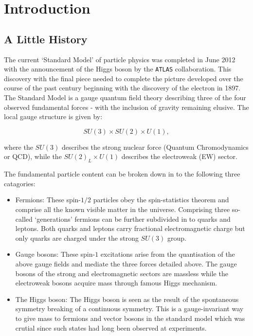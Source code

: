 \chapter{Introduction}
\label{chap:intro}

\section{A Little History}
\label{sec:history}

	The current `Standard Model' of particle physics was completed in June 2012 with the announcement of the Higgs boson by the \texttt{ATLAS} collaboration.
	This discovery with the final piece needed to complete the picture developed over the course of the past century beginning with the discovery of the electron in 1897.
	The Standard Model is a gauge quantum field theory describing three of the four observed fundamental forces - with the inclusion of gravity remaining elusive.
	The local gauge structure is given by:

	\begin{equation}
		SU(3)\times SU(2)\times U(1),
		\label{eq:SMGauge}
	\end{equation}

	where the $SU(3)$ describes the strong nuclear force (Quantum Chromodynamics or QCD), while the $SU(2)_L\times U(1)$ describes the electroweak (EW) sector.

	The fundamental particle content can be broken down in to the following three catagories:

	\begin{itemize}
		\item Fermions: These spin-$1/2$ particles obey the spin-statistics theorem and comprise all the known visible matter in the universe.
		Comprising three so-called `generations' fermions can be further subdivided in to quarks and leptons.  Both quarks and leptons
		carry fractional electromagnetic charge but only quarks are charged under the strong $SU(3)$ group.
		\item Gauge bosons: These spin-$1$ excitations arise from the quantisation of the above gauge fields and mediate the three forces detailed above.
		The gauge bosons of the strong and electromagnetic sectors are massless while the electroweak bosons acquire mass through famous Higgs mechanism.
		\item The Higgs boson: The Higgs boson is seen as the result of the spontaneous symmetry breaking of a continuous symmetry.
		This is a gauge-invariant way to give mass to fermions and vector bosons in the standard model which was crutial since such states had long been
		observed at experiments.
	\end{itemize}

